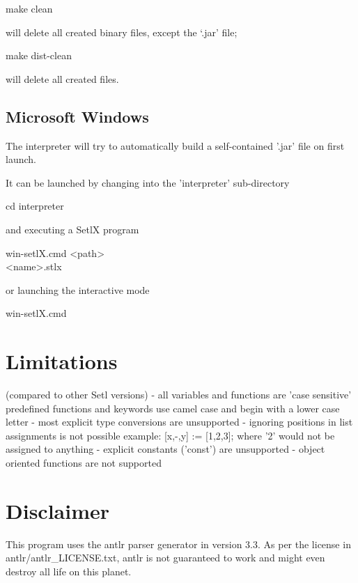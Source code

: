         make clean

    will delete all created binary files, except the `.jar' file;

        make dist-clean

    will delete all created files.

\subsection{Microsoft Windows}
    The interpreter will try to automatically build a self-contained '.jar' file
    on first launch.

    It can be launched by changing into the 'interpreter' sub-directory

        cd interpreter

    and executing a SetlX program

        win-setlX.cmd <path>\\<name>.stlx

    or launching the interactive mode

        win-setlX.cmd


\section{Limitations}
 (compared to other Setl versions)
    - all variables and functions are 'case sensitive'
        predefined functions and keywords use camel case and begin with a lower case letter
    - most explicit type conversions are unsupported
    - ignoring positions in list assignments is not possible
        example: [x,-,y] := [1,2,3]; where '2' would not be assigned to anything
    - explicit constants ('const') are unsupported
    - object oriented functions are not supported

\section{Disclaimer}
    This program uses the antlr parser generator in version 3.3.
    As per the license in antlr/antlr\_LICENSE.txt, antlr is not guaranteed to
    work and might even destroy all life on this planet.



